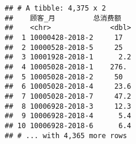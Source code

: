 \documentclass[
]{article}
\begin{document}
\begin{verbatim}
## # A tibble: 4,375 x 2
##    顾客_月         总消费额
##    <chr>              <dbl>
##  1 10000428-2018-2     17  
##  2 10000528-2018-5     25  
##  3 10001928-2018-1      2.2
##  4 10005028-2018-1    276. 
##  5 10005028-2018-2     50  
##  6 10005028-2018-4     23.6
##  7 10005028-2018-7     47.2
##  8 10006928-2018-3     12.3
##  9 10006928-2018-4      5.4
## 10 10006928-2018-6      6.4
## # ... with 4,365 more rows
\end{verbatim}
\end{document}
